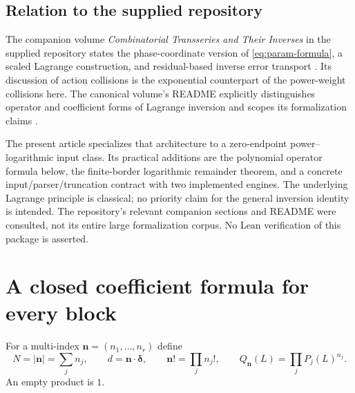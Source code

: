 \documentclass[11pt,a4paper]{article}
\numberwithin{equation}{section}
\theoremstyle{definition}
\newcommand{\nn}{\boldsymbol n}
\newcommand{\del}{\boldsymbol\delta}
\begin{document}
\subsection{Relation to the supplied repository}
The companion volume \emph{Combinatorial Transseries and Their Inverses}
in the supplied repository states the phase-coordinate version of
\eqref{eq:param-formula}, a scaled Lagrange construction, and
residual-based inverse error transport \cite{companion}. Its discussion
of action collisions is the exponential counterpart of the power-weight
collisions here. The canonical volume's README explicitly distinguishes
operator and coefficient forms of Lagrange inversion and scopes its
formalization claims \cite{repo-readme}.

The present article specializes that architecture to a zero-endpoint
power--logarithmic input class. Its practical additions are the polynomial
operator formula below, the finite-border logarithmic remainder theorem,
and a concrete input/parser/truncation contract with two implemented
engines. The underlying Lagrange principle is classical; no priority claim
for the general inversion identity is intended. The repository's relevant
companion sections and README were consulted, not its entire large
formalization corpus. No Lean verification of this package is asserted.

\section{A closed coefficient formula for every block}
\label{sec:coefficients}

For a multi-index $\nn=(n_1,\ldots,n_r)$ define
\[
 N=|\nn|=\sum_j n_j,\qquad
 d=\nn\cdot\del,\qquad
 \nn!=\prod_j n_j!,\qquad
 Q_{\nn}(L)=\prod_jP_j(L)^{n_j}.
\]
An empty product is $1$.
\end{document}
